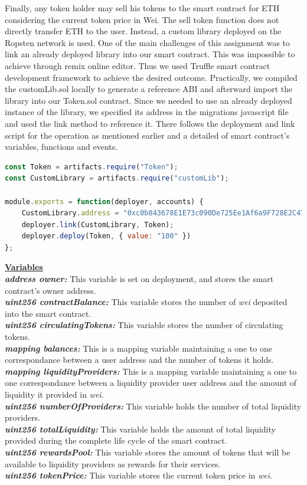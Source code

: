 \documentclass[12pt,a4paper]{article}
\begin{document}
Finally, any token holder may sell his tokens to the smart contract for ETH
considering the current token price in Wei. The sell token function does not
directly transfer ETH to the user. Instead, a custom library deployed on the
Ropsten network is used. One of the main challenges of this assignment was to
link an already deployed library into our smart contract. This was impossible to
achieve through remix online editor. Thus we used Truffle smart contract
development framework to achieve the desired outcome. Practically, we compiled
the customLib.sol locally to generate a reference ABI and afterward import the
library into our Token.sol contract. Since we needed to use an already deployed
instance of the library, we specified its address in the migrations javascript
file and used the link method to reference it. There follows the deployment and
link script for the operation as mentioned earlier and a detailed of smart
contract's variables, functions and events. \\

\begin{lstlisting}[language=JavaScript]
const Token = artifacts.require("Token");
const CustomLibrary = artifacts.require("customLib");

module.exports = function(deployer, accounts) {
    CustomLibrary.address = "0xc0b843678E1E73c090De725Ee1Af6a9F728E2C47"
    deployer.link(CustomLibrary, Token);
    deployer.deploy(Token, { value: "100" })
};
\end{lstlisting}


\textbf{\underline{Variables}} \\
\textbf{\emph{address owner:}} This variable is set on deployment, and stores the smart
contract's owner address.\\
\textbf{\emph{uint256 contractBalance:}} This variable stores the number of \emph{wei} deposited
into the smart contract.\\
\textbf{\emph{uint256 circulatingTokens:}}  This variable stores the number of
circulating tokens.\\
\textbf{\emph{mapping balances:}} This is a mapping variable maintaining a one to one
correspondance between a user address and the number of tokens it holds. \\
\textbf{\emph{mapping liquidityProviders:}} This is a mapping variable maintaining a one
to one correspondance between a liquidity provider user address and the amount
of liquidity it provided in \emph{wei}. \\
\textbf{\emph{uint256 numberOfProviders:}} This variable holds the number of total
liquidity providers.\\
\textbf{\emph{uint256 totalLiquidity:}} This variable holds the amount of total liquidity
provided during the complete life cycle of the smart contract.\\
\textbf{\emph{uint256 rewardsPool:}} This variable stores the amount of tokens that will
be available to liquidity providers as rewards for their services.\\
\textbf{\emph{uint256 tokenPrice:}} This variable stores the current token price in
\emph{wei}.\\
\end{document}
